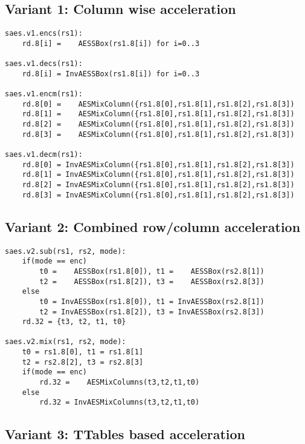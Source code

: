 
\subsection{Variant 1: Column wise acceleration}

\begin{lstlisting}[language=pseudo,style=block]
saes.v1.encs(rs1):
    rd.8[i] =    AESSBox(rs1.8[i]) for i=0..3

saes.v1.decs(rs1):
    rd.8[i] = InvAESSBox(rs1.8[i]) for i=0..3

saes.v1.encm(rs1):
    rd.8[0] =    AESMixColumn({rs1.8[0],rs1.8[1],rs1.8[2],rs1.8[3])
    rd.8[1] =    AESMixColumn({rs1.8[0],rs1.8[1],rs1.8[2],rs1.8[3])
    rd.8[2] =    AESMixColumn({rs1.8[0],rs1.8[1],rs1.8[2],rs1.8[3])
    rd.8[3] =    AESMixColumn({rs1.8[0],rs1.8[1],rs1.8[2],rs1.8[3])

saes.v1.decm(rs1):
    rd.8[0] = InvAESMixColumn({rs1.8[0],rs1.8[1],rs1.8[2],rs1.8[3])
    rd.8[1] = InvAESMixColumn({rs1.8[0],rs1.8[1],rs1.8[2],rs1.8[3])
    rd.8[2] = InvAESMixColumn({rs1.8[0],rs1.8[1],rs1.8[2],rs1.8[3])
    rd.8[3] = InvAESMixColumn({rs1.8[0],rs1.8[1],rs1.8[2],rs1.8[3])
\end{lstlisting}


\subsection{Variant 2: Combined row/column acceleration}

\cite{TG:20}

\begin{lstlisting}[language=pseudo,style=block]
saes.v2.sub(rs1, rs2, mode):
    if(mode == enc)
        t0 =    AESSBox(rs1.8[0]), t1 =    AESSBox(rs2.8[1])
        t2 =    AESSBox(rs1.8[2]), t3 =    AESSBox(rs2.8[3])
    else
        t0 = InvAESSBox(rs1.8[0]), t1 = InvAESSBox(rs2.8[1])
        t2 = InvAESSBox(rs1.8[2]), t3 = InvAESSBox(rs2.8[3])
    rd.32 = {t3, t2, t1, t0} 

saes.v2.mix(rs1, rs2, mode):
    t0 = rs1.8[0], t1 = rs1.8[1]
    t2 = rs2.8[2], t3 = rs2.8[3]
    if(mode == enc)
        rd.32 =    AESMixColumns(t3,t2,t1,t0)
    else
        rd.32 = InvAESMixColumns(t3,t2,t1,t0)
\end{lstlisting}


\subsection{Variant 3: TTables based acceleration}

